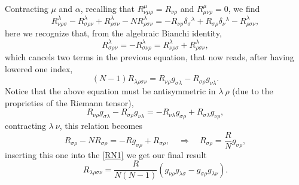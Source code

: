 Contracting $\mu$ and $\alpha$, recalling that $R^\mu_{\nu\mu\rho }=R_{\nu\rho}$ and $R^\mu_{\mu\nu\rho}=0$, we find
$$R^\lambda_{\nu\rho\sigma}-R^\lambda_{\sigma\rho\nu}+R^\lambda_{\rho\sigma\nu}-NR^\lambda_{\rho\sigma\nu}=-R_{\nu\rho}\delta_\sigma\phantom{}^\lambda+R_{\sigma\rho}\delta_\nu\phantom{}^\lambda-R^\lambda_{\rho\sigma\nu},$$
here we recognize that, from the algebraic Bianchi identity, $$R^\lambda_{\sigma\rho\nu}=-R^\lambda_{\sigma\nu\rho}=R^\lambda_{\nu\rho\sigma}+R^\lambda_{\rho\sigma\nu},$$ which cancels two terms in the previous equation, that now reads, after having lowered one index, 
\begin{equation}\label{RN1}
    (N-1)R_{\lambda\rho\sigma\nu}=R_{\nu\rho}g_{\sigma\lambda}-R_{\sigma\rho}g_{\nu\lambda}.
\end{equation}
Notice that the above equation must be antisymmetric in $\lambda\ \rho$ (due to the proprieties of the Riemann tensor),$$
R_{\nu\rho}g_{\sigma\lambda}-R_{\sigma\rho}g_{\nu\lambda}=-R_{\nu\lambda}g_{\sigma\rho}+R_{\sigma\lambda}g_{\nu\rho},
$$ contracting $\lambda\ \nu$, this relation becomes 
\begin{equation}
    R_{\sigma\rho}-NR_{\sigma\rho}=-Rg_{\sigma\rho}+R_{\sigma\rho},\quad \Rightarrow\quad \boxed{R_{\sigma\rho}=\frac{R}{N}g_{\sigma\rho}},
\end{equation}
inserting this one into the \eqref{RN1} we get our final result
\begin{equation}
        R_{\lambda\rho\sigma\nu}=\frac{R}{N(N-1)}(g_{\nu\rho}g_{\lambda\sigma}-g_{\sigma\rho}g_{\lambda\nu}).
\end{equation}